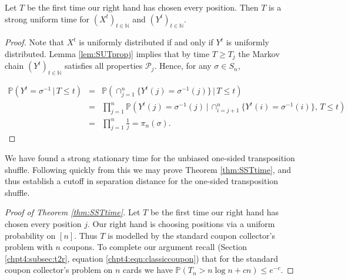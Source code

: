\documentclass[11pt]{report}
\begin{document}
\begin{lemma}
	\label{lem:SUTresutl}
	Let $T$ be the first time our right hand has chosen every position. Then $T$ is a strong uniform time for $(X^{t})_{t\in\mathbb{N}}$ and $(Y^{t})_{t\in\mathbb{N}}$.
	
\end{lemma}

\begin{proof}
	Note that $X^{t}$ is uniformly distributed if and only if $Y^{t}$ is uniformly distributed. Lemma \ref{lem:SUTpropj} implies that by time $T \geq T_{j}$ the Markov chain $(Y^{t})_{t \in \mathbb{N}}$ satisfies all properties $\mathcal{P}_{j}$. Hence, for any $\sigma \in  S_{n}$,  

	\begin{eqnarray*}
		\mathbb{P}(Y^{t} = \sigma^{-1} \, | \, T\leq t) & = &\mathbb{P}\left( 
		\cap_{j=1}^{n} \{Y^{t}(j) = \sigma^{-1}(j) \} \, | \, T\leq t\right)\\  
		& = & \prod_{j=1}^{n}\mathbb{P}\left(  Y^{t}(j) = \sigma^{-1}(j) \, | \, 
		\cap_{i=j+1}^{n} \{
		Y^{t}(i) = \sigma^{-1}(i) \},\, T\leq t\right) \\
		& = &	\prod_{j=1}^{n} 
		\frac{1}{j} = \pi_{n}(\sigma).
	\end{eqnarray*}
\end{proof}



We have found a strong stationary time for the unbiased one-sided transposition shuffle. Following quickly from this we may prove Theorem \ref{thm:SSTtime}, and thus establish a cutoff in separation distance for the one-sided transposition shuffle.

\begin{proof}[Proof of Theorem \ref{thm:SSTtime}]
	Let $T$ be the first time our right hand has chosen every position 
	$j$. 
	Our right hand is choosing positions via a uniform probability on 
	$[n]$. Thus $T$ is modelled by the standard coupon collector's problem with $n$ 	coupons. To complete our argument recall (Section \ref{chpt4:subsec:t2r}, equation \eqref{chpt4:eqn:classiccoupon})  that for the standard coupon collector's problem on $n$ cards we have $\mathbb{P}(T_{n} >n\log n +cn) \leq e^{-c}$. 
\end{proof} 
\end{document}
